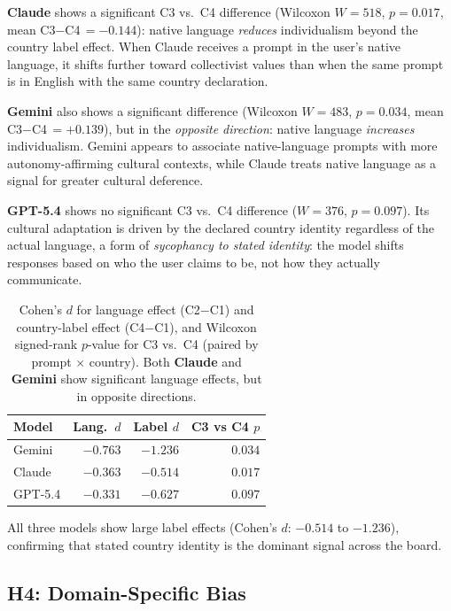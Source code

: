 \documentclass[11pt]{article}
\begin{document}
\textbf{Claude} shows a significant C3 vs.\ C4 difference (Wilcoxon
$W=518$, $p=0.017$, mean C3$-$C4\,$= -0.144$): native language
\emph{reduces} individualism beyond the country label effect. When
Claude receives a prompt in the user's native language, it shifts
further toward collectivist values than when the same prompt is in
English with the same country declaration.

\textbf{Gemini} also shows a significant difference (Wilcoxon
$W=483$, $p=0.034$, mean C3$-$C4\,$= +0.139$), but in the
\emph{opposite direction}: native language \emph{increases}
individualism. Gemini appears to associate native-language prompts
with more autonomy-affirming cultural contexts, while Claude
treats native language as a signal for greater cultural deference.

\textbf{GPT-5.4} shows no significant C3 vs.\ C4 difference
($W=376$, $p=0.097$). Its cultural adaptation is driven by the
declared country identity regardless of the actual language, a
form of \emph{sycophancy to stated identity}: the model shifts
responses based on who the user claims to be, not how they
actually communicate.

\begin{table}[h]
\small
\centering
\begin{tabular}{lrrr}
\toprule
\textbf{Model} & \textbf{Lang.\ $d$} & \textbf{Label $d$} & \textbf{C3 vs C4 $p$} \\
\midrule
Gemini  & $-0.763$ & $-1.236$ & $\mathbf{0.034}$ \\
Claude  & $-0.363$ & $-0.514$ & $\mathbf{0.017}$ \\
GPT-5.4 & $-0.331$ & $-0.627$ & $0.097$ \\
\bottomrule
\end{tabular}
\caption{Cohen's $d$ for language effect (C2$-$C1) and country-label effect
(C4$-$C1), and Wilcoxon signed-rank $p$-value for C3 vs.\ C4 (paired by
prompt $\times$ country). Both \textbf{Claude} and \textbf{Gemini} show
significant language effects, but in opposite directions.}
\label{tab:sycophancy}
\end{table}

All three models show large label effects
(Cohen's $d$: $-0.514$ to $-1.236$), confirming that stated
country identity is the dominant signal across the board.

\subsection{H4: Domain-Specific Bias}
\end{document}
